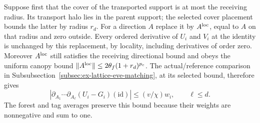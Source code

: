 Suppose first that the cover of the transported support is at most the
receiving radius. Its transport halo lies in the parent support; the
selected cover placement bounds the latter by radius $r_d$. For a direction
$A$ replace it by $A^{\rm loc}$, equal to $A$ on that radius and zero
outside. Every ordered derivative of $U_i$ and $V_i$ at the identity is
unchanged by this replacement, by locality, including derivatives of
order zero. Moreover $A^{\rm loc}$ still satisfies the receiving
directional bound and obeys the uniform canopy bound
$\|A^{\rm loc}\|\le2\theta_f(1+r_d)^{p_c}$.
The actual/reference comparison in
Subsubsection~\ref{subsec:ex-lattice-eve-matching}, at its selected bound,
therefore gives
\[
 |\partial_{A_1}\cdots\partial_{A_\ell}(U_i-G_i)(\mathrm{id})|
       \le (v/\chi)w_i,\qquad \ell\le d.
\]
The forest and tag averages preserve this bound because their weights
are nonnegative and sum to one.

